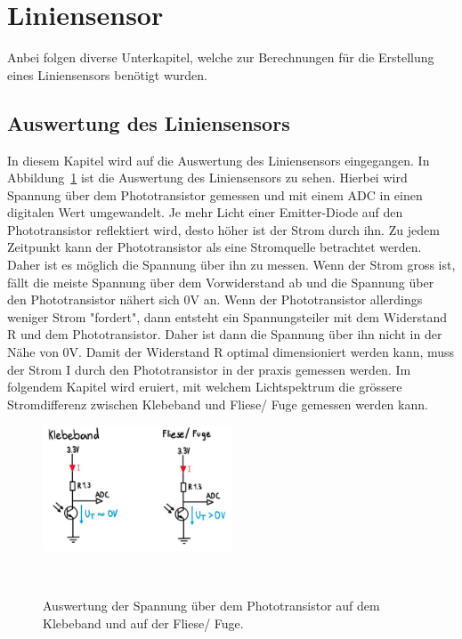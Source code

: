 \documentclass[main.tex]{subfiles} %
\begin{document}

\section{Liniensensor}
Anbei folgen diverse Unterkapitel, welche zur Berechnungen für die Erstellung eines Liniensensors benötigt wurden.

\subsection{Auswertung des Liniensensors}
In diesem Kapitel wird auf die Auswertung des Liniensensors eingegangen. In Abbildung~\ref{fig:Auswertung_Liniensensor} ist die
Auswertung des Liniensensors zu sehen. Hierbei wird Spannung über dem Phototransistor gemessen und mit einem ADC in einen digitalen
Wert umgewandelt. Je mehr Licht einer Emitter-Diode auf den Phototransistor reflektiert wird, desto höher ist der Strom durch ihn. Zu jedem
Zeitpunkt kann der Phototransistor als eine Stromquelle betrachtet werden. Daher ist es möglich die Spannung über ihn zu messen. Wenn der Strom
gross ist, fällt die meiste Spannung über dem Vorwiderstand ab und die Spannung über den Phototransistor nähert sich 0V an. Wenn der Phototransistor
allerdings weniger Strom "fordert", dann entsteht ein Spannungsteiler mit dem Widerstand R und dem Phototransistor. Daher ist dann die Spannung über ihn nicht in
der Nähe von 0V. Damit der Widerstand R optimal dimensioniert werden kann, muss der Strom I durch den Phototransistor in der praxis gemessen
werden. Im folgendem Kapitel wird  eruiert, mit welchem Lichtspektrum die grössere Stromdifferenz zwischen Klebeband und Fliese/ Fuge gemessen werden kann.


\begin{figure}[h!]
    \centering
    \includegraphics[width=0.5\textwidth]{./fig_Liniensensor/Auswertung_Liniensensor}
    \caption{Auswertung der Spannung über dem Phototransistor auf dem Klebeband und auf der Fliese/ Fuge.}~\label{fig:Auswertung_Liniensensor}
\end{figure}
\end{document}
